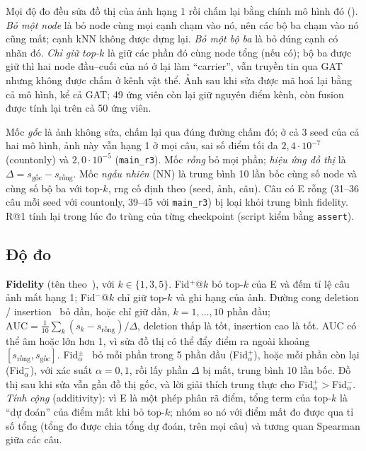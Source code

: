 Mọi độ đo đều sửa đồ thị của ảnh hạng 1 rồi chấm lại bằng chính mô hình đó ().
\emph{Bỏ một node} là bỏ node cùng mọi cạnh chạm vào nó, nên các bộ ba chạm vào nó cũng mất; cạnh kNN không được dựng lại.
\emph{Bỏ một bộ ba} là bỏ đúng cạnh có nhãn đó.
\emph{Chỉ giữ top-$k$} là giữ các phần đó cùng node tổng (nếu có); bộ ba được giữ thì hai node đầu--cuối của nó ở lại làm ``carrier'', vẫn truyền tin qua GAT nhưng không được chấm ở kênh vật thể.
Ảnh sau khi sửa được mã hoá lại bằng cả mô hình, kể cả GAT; 49 ứng viên còn lại giữ nguyên điểm kênh, còn fusion được tính lại trên cả 50 ứng viên.

Mốc \emph{gốc} là ảnh không sửa, chấm lại qua đúng đường chấm đó; ở cả 3 seed của cả hai mô hình, ảnh này vẫn hạng 1 ở mọi câu, sai số điểm tối đa $2{,}4\cdot10^{-7}$ (countonly) và $2{,}0\cdot10^{-5}$ (\texttt{main\_r3}).
Mốc \emph{rỗng} bỏ mọi phần; \emph{hiệu ứng đồ thị} là $\Delta=s_{\text{gốc}}-s_{\text{rỗng}}$.
Mốc \emph{ngẫu nhiên} (NN) là trung bình 10 lần bốc cùng số node và cùng số bộ ba với top-$k$, rng cố định theo (seed, ảnh, câu).
Câu có E rỗng (31--36 câu mỗi seed với countonly, 39--45 với \texttt{main\_r3}) bị loại khỏi trung bình fidelity.
R@1 tính lại trong lúc đo trùng  của từng checkpoint (script kiểm bằng \texttt{assert}).

\subsection{Độ đo}\label{sec:xai-metrics}

\textbf{Fidelity} (tên theo~\cite{xai-yuan2023survey}), với $k\in\{1,3,5\}$.
Fid$^{+}$@$k$ bỏ top-$k$ của E và đếm tỉ lệ câu ảnh mất hạng 1; Fid$^{-}$@$k$ chỉ giữ top-$k$ và ghi hạng của ảnh.
Đường cong deletion / insertion~\cite{xai-petsiuk2018rise} bỏ dần, hoặc chỉ giữ dần, $k=1,\dots,10$ phần đầu; $\mathrm{AUC}=\frac{1}{10}\sum_{k}(s_k-s_{\text{rỗng}})/\Delta$, deletion thấp là tốt, insertion cao là tốt.
AUC có thể âm hoặc lớn hơn 1, vì sửa đồ thị có thể đẩy điểm ra ngoài khoảng $[s_{\text{rỗng}},s_{\text{gốc}}]$.
Fid$_{\alpha}^{\pm}$~\cite{xai-zheng2024fidalpha} bỏ mỗi phần trong 5 phần đầu (Fid$_{\alpha}^{+}$), hoặc mỗi phần còn lại (Fid$_{\alpha}^{-}$), với xác suất $\alpha=0{,}1$, rồi lấy phần $\Delta$ bị mất, trung bình 10 lần bốc.
Đồ thị sau khi sửa vẫn gần đồ thị gốc, và lời giải thích trung thực cho Fid$_{\alpha}^{+}>{}$Fid$_{\alpha}^{-}$.
\emph{Tính cộng} (additivity): vì E là một phép phân rã điểm, tổng term của top-$k$ là ``dự đoán'' của điểm mất khi bỏ top-$k$; nhóm so nó với điểm mất đo được qua tỉ số tổng (tổng đo được chia tổng dự đoán, trên mọi câu) và tương quan Spearman giữa các câu.

